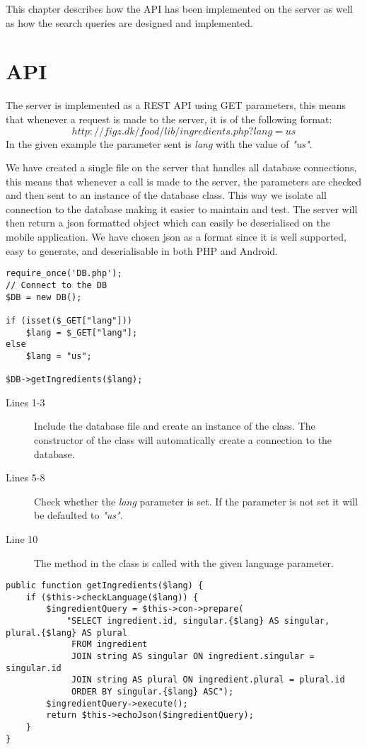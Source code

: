 This chapter describes how the API has been implemented on the server as well as how the search queries are designed and implemented.
\section{API}
\label{sec:com}

The server is implemented as a REST API using GET parameters, this means that whenever a request is made to the server, it is of the following format: $$http://figz.dk/food/lib/ingredients.php?lang=us$$ In the given example the parameter sent is \textit{lang} with the value of \textit{"us"}.

We have created a single file on the server that handles all database connections, this means that whenever a call is made to the server, the parameters are checked and then sent to an instance of the database class. This way we isolate all connection to the database making it easier to maintain and test. The server will then return a \ac{json} formatted object which can easily be deserialised on the mobile application. We have chosen \ac{json} as a format since it is well supported, easy to generate, and deserialisable in both PHP and Android.

\begin{lstlisting}[language=phpstyle, caption=ingredients.php.]
require_once('DB.php');
// Connect to the DB
$DB = new DB();

if (isset($_GET["lang"]))
	$lang = $_GET["lang"];
else
	$lang = "us";

$DB->getIngredients($lang);
\end{lstlisting}%

\begin{description}
\item[Lines 1-3] Include the database file and create an instance of the  class. The constructor of the  class will automatically create a connection to the database.
\item[Lines 5-8] Check whether the \textit{lang} parameter is set. If the parameter is not set it will be defaulted to \textit{"us"}.
\item[Line 10] The method  in the  class is called with the given language parameter.
\end{description}

\begin{lstlisting}[language=phpstyle, label=lst:getIngredients, caption=getIngredients() method of DB class.]
public function getIngredients($lang) {
    if ($this->checkLanguage($lang)) {
        $ingredientQuery = $this->con->prepare(
            "SELECT ingredient.id, singular.{$lang} AS singular, plural.{$lang} AS plural
             FROM ingredient
             JOIN string AS singular ON ingredient.singular = singular.id
             JOIN string AS plural ON ingredient.plural = plural.id
             ORDER BY singular.{$lang} ASC");
        $ingredientQuery->execute();
        return $this->echoJson($ingredientQuery);
    }
}
\end{lstlisting}%

